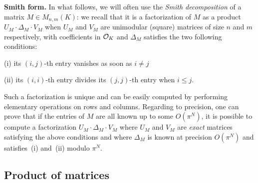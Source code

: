\documentclass{sig-alternate}
\begin{document}
\medskip

\noindent
{\bf Smith form.}
In what follows, we will often use the \emph{Smith decomposition} of a 
matrix $M \in M_{n,m}(K)$: we recall that it is a factorization of $M$ 
as a product $U_M \cdot \Delta_M \cdot V_M$ when $U_M$ and $V_M$ are 
unimodular (square) matrices of size $n$ and $m$ respectively, with 
coefficients in $\mathcal O_K$ and $\Delta_M$ satisfies the two following
conditions:

\noindent
(i) its $(i,j)$-th entry vanishes as soon as $i \neq j$

\noindent
(ii) its $(i,i)$-th entry divides its $(j,j)$-th entry when $i
\leq j$.

\noindent
Such a factorization is unique and can be easily computed by performing 
elementary operations on rows and columns.
Regarding to precision, one can prove that if the entries of $M$ are all 
known up to some $O(\pi^N)$, it is possible to compute a factorization 
$U_M \cdot \Delta_M \cdot V_M$ where $U_M$ and $V_M$ are \emph{exact}
matrices satisfying the above conditions and where $\Delta_M$ is known
at precision $O(\pi^N)$ and satisfies~(i) and~(ii) modulo $\pi^N$.


\subsection{Product of matrices}
\end{document}
